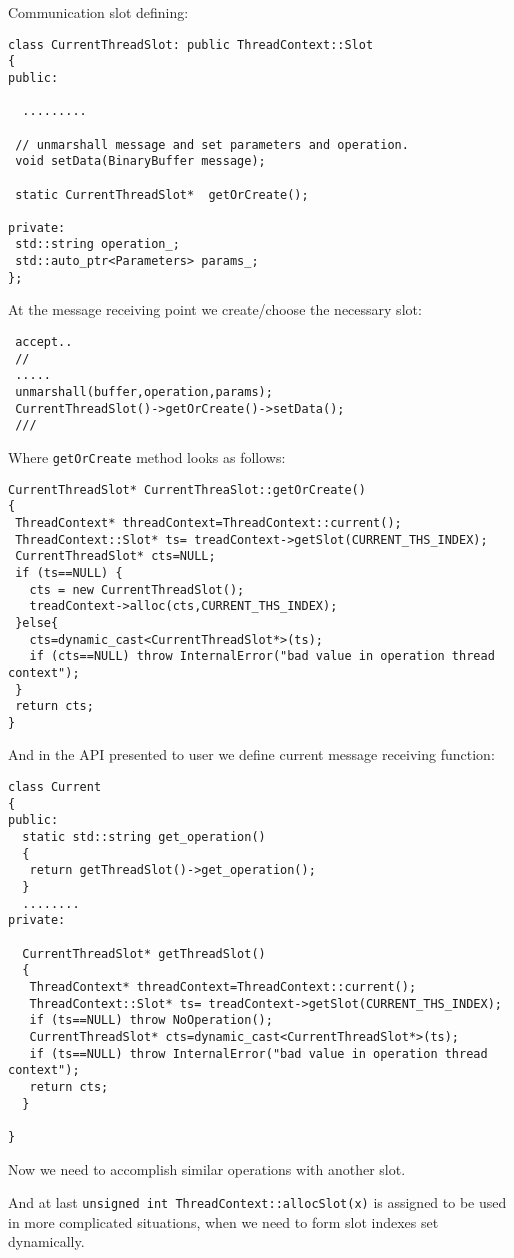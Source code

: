 \documentclass[10pt]{article}
\begin{document}
 Communication slot defining:
\begin{verbatim}
class CurrentThreadSlot: public ThreadContext::Slot
{
public:

  .........
 
 // unmarshall message and set parameters and operation.
 void setData(BinaryBuffer message);

 static CurrentThreadSlot*  getOrCreate();

private:
 std::string operation_;
 std::auto_ptr<Parameters> params_;
};
\end{verbatim}

 At the message receiving point we create/choose the necessary slot:
\begin{verbatim}
 accept..
 // 
 .....
 unmarshall(buffer,operation,params);
 CurrentThreadSlot()->getOrCreate()->setData();
 ///
\end{verbatim}

Where \verb|getOrCreate| method looks as follows:
\begin{verbatim}
CurrentThreadSlot* CurrentThreaSlot::getOrCreate()
{
 ThreadContext* threadContext=ThreadContext::current();
 ThreadContext::Slot* ts= treadContext->getSlot(CURRENT_THS_INDEX);
 CurrentThreadSlot* cts=NULL;
 if (ts==NULL) {
   cts = new CurrentThreadSlot();
   treadContext->alloc(cts,CURRENT_THS_INDEX);
 }else{
   cts=dynamic_cast<CurrentThreadSlot*>(ts);
   if (cts==NULL) throw InternalError("bad value in operation thread context");
 }
 return cts; 
}
\end{verbatim}

And in the API presented to user we define current message receiving function:
\begin{verbatim}
class Current
{
public:
  static std::string get_operation()
  {
   return getThreadSlot()->get_operation();
  }
  ........
private:

  CurrentThreadSlot* getThreadSlot()
  {
   ThreadContext* threadContext=ThreadContext::current();
   ThreadContext::Slot* ts= treadContext->getSlot(CURRENT_THS_INDEX);
   if (ts==NULL) throw NoOperation();
   CurrentThreadSlot* cts=dynamic_cast<CurrentThreadSlot*>(ts);
   if (ts==NULL) throw InternalError("bad value in operation thread context");
   return cts; 
  }

}
\end{verbatim}
 
 Now we need to accomplish similar operations with another slot.

 And at last \verb|unsigned int ThreadContext::allocSlot(x)| is assigned to be used
in more complicated situations, when we need to form slot indexes set dynamically.
\end{document}
